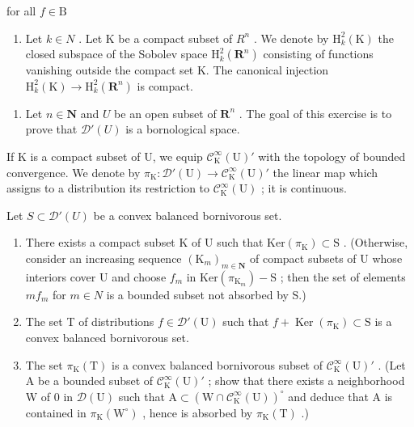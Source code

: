 for all \(f\in \mathrm{B}\)

\begin{enumerate}
\def\labelenumi{\alph{enumi})}
\setcounter{enumi}{1}
\tightlist
\item
  Let \(k \in N\) . Let K be a compact subset of \(R^{n}\) . We denote by \(\mathrm{H}_{k}^{2}(\mathrm{K})\) the closed subspace of the Sobolev space \(\mathrm{H}_{k}^{2}(\mathbf{R}^{n})\) consisting of functions vanishing outside the compact set K. The canonical injection \(\mathrm{H}_{k}^{2}(\mathrm{K}) \to \mathrm{H}_{k}^{2}(\mathbf{R}^{n})\) is compact.
\end{enumerate}

\begin{enumerate}
\def\labelenumi{\arabic{enumi})}
\setcounter{enumi}{17}
\tightlist
\item
  Let \(n \in \mathbf{N}\) and \(U\) be an open subset of \(\mathbf{R}^n\) . The goal of this exercise is to prove that \(\mathcal{D}'(U)\) is a bornological space.
\end{enumerate}

If K is a compact subset of U, we equip \(\mathcal{C}_{\mathrm{K}}^{\infty}(\mathrm{U})'\) with the topology of bounded convergence. We denote by \(\pi_{\mathrm{K}}\colon\mathcal{D}'(\mathrm{U})\to\mathcal{C}_{\mathrm{K}}^{\infty}(\mathrm{U})'\) the linear map which assigns to a distribution its restriction to \(\mathcal{C}_{\mathrm{K}}^{\infty}(\mathrm{U})\) ; it is continuous.

Let \(S \subset \mathcal{D}'(U)\) be a convex balanced bornivorous set.

\begin{enumerate}
\def\labelenumi{\alph{enumi})}
\item
  There exists a compact subset K of U such that \(\mathrm{Ker}(\pi_{\mathrm{K}}) \subset \mathrm{S}\) . (Otherwise, consider an increasing sequence \((\mathrm{K}_{m})_{m \in \mathbf{N}}\) of compact subsets of U whose interiors cover U and choose \(f_{m}\) in \(\mathrm{Ker}(\pi_{\mathrm{K}_{m}}) - \mathrm{S}\) ; then the set of elements \(mf_{m}\) for \(m \in N\) is a bounded subset not absorbed by S.)
\item
  The set T of distributions \(f \in \mathcal{D}'(\mathrm{U})\) such that \(f + \operatorname{Ker}(\pi_{\mathrm{K}}) \subset \mathrm{S}\) is a convex balanced bornivorous set.
\item
  The set \(\pi_{\mathrm{K}}(\mathrm{T})\) is a convex balanced bornivorous subset of \(\mathcal{C}_{\mathrm{K}}^{\infty}(\mathrm{U})'\) . (Let A be a bounded subset of \(\mathcal{C}_{\mathrm{K}}^{\infty}(\mathrm{U})'\) ; show that there exists a neighborhood W of 0 in \(\mathcal{D}(\mathrm{U})\) such that \(\mathrm{A} \subset (\mathrm{W} \cap \mathcal{C}_{\mathrm{K}}^{\infty}(\mathrm{U}))^{\circ}\) and deduce that A is contained in \(\pi_{\mathrm{K}}(\mathrm{W}^{\circ})\) , hence is absorbed by \(\pi_{\mathrm{K}}(\mathrm{T})\) .)
\end{enumerate}

